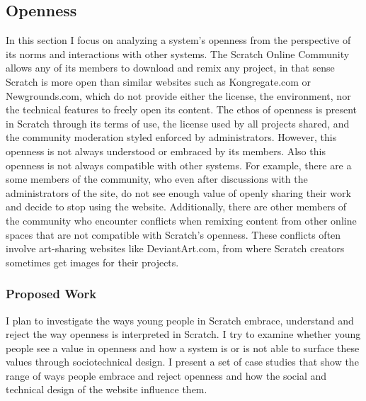 
\subsection{Openness}
In this section I focus on analyzing a system's openness from the perspective of its norms and interactions with other systems.
The Scratch Online Community allows any of its members to download and remix any project, in that sense Scratch is more open than similar websites such as Kongregate.com or Newgrounds.com, which do not provide either the license, the environment, nor the technical features to freely open its content. 
The ethos of openness is present in Scratch through its terms of use, the license used by all projects shared, and the community moderation styled enforced by administrators.
However, this openness is not always understood or embraced by its members.
Also this openness is not always compatible with other systems.
For example, there are a some members of the community, who even after discussions with the administrators of the site, do not see enough value of openly sharing their work and decide to stop using the website. 
Additionally, there are other members of the community who encounter conflicts when remixing content from other online spaces that are not compatible with Scratch's openness. 
These conflicts often involve art-sharing websites like DeviantArt.com, from where Scratch creators sometimes get images for their projects.

\subsubsection{Proposed Work}
I plan to investigate the ways young people in Scratch embrace, understand and reject the way openness is interpreted in Scratch.
I try to examine whether young people see a value in openness and how a system is or is not able to surface these values through sociotechnical design.
I present a set of case studies that show the range of ways people embrace and reject openness and how the social and technical design of the website influence them. 

